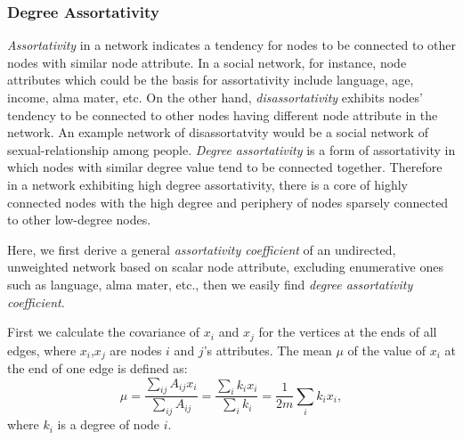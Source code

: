 \documentclass{article}
\begin{document}
	\subsubsection{Degree Assortativity}
	\textit{Assortativity} in a network indicates a tendency for nodes to be connected to other nodes with similar node attribute. In a social network, for instance, node attributes which could be the basis for assortativity include language, age, income, alma mater, etc. On the other hand, \textit{disassortativity} exhibits nodes' tendency to be connected to other nodes having different node attribute in the network. An example network of disassortatvity would be a social network of sexual-relationship among people. 
	\textit{Degree assortativity} is a form of assortativity in which nodes with similar degree value tend to be connected together. Therefore in a network exhibiting high degree assortativity, there is a core of highly connected nodes with the high degree and periphery of nodes sparsely connected to other low-degree nodes.
	
	Here, we first derive a general \textit{assortativity coefficient} of an undirected, unweighted network based on scalar node attribute, excluding enumerative ones such as language, alma mater, etc., then we easily find \textit{degree assortativity coefficient}.
	
	First we calculate the covariance of $x_i$ and $x_j$ for the vertices at the ends of all edges, where $x_i$,$x_j$ are nodes $i$ and $j$'s attributes.
	The mean $\mu$ of the value of $x_i$ at the end of one edge is defined as:
	\begin{equation}
	\mu = \frac{ \sum_{ij}A_{ij}x_i }{\sum_{ij}A_{ij}} = \frac{\sum_i k_i x_i}{\sum_i k_i} = \frac{1}{2m}\sum_i k_i x_i,
	\end{equation}
where $k_i$ is a degree of node $i$.
\end{document}
